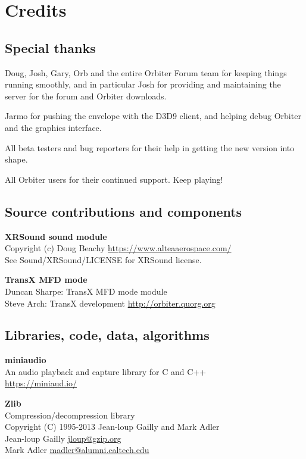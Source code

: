 \documentclass[Orbiter User Manual.tex]{subfiles}
\begin{document}
\section{Credits}

\subsection{Special thanks}
Doug, Josh, Gary, Orb and the entire Orbiter Forum team for keeping things
running smoothly, and in particular Josh for providing and maintaining the
server for the forum and Orbiter downloads.

Jarmo for pushing the envelope with the D3D9 client, and helping debug Orbiter
and the graphics interface.

All beta testers and bug reporters for their help in getting the new version
into shape.

All Orbiter users for their continued support. Keep playing!

\subsection{Source contributions and components}
\textbf{XRSound sound module}\\
Copyright (c) Doug Beachy \url{https://www.alteaaerospace.com/}\\
See Sound/XRSound/LICENSE for XRSound license.

\textbf{TransX MFD mode}\\
Duncan Sharpe: TransX MFD mode module\\
Steve Arch: TransX development \url{http://orbiter.quorg.org}

\subsection{Libraries, code, data, algorithms}
\textbf{miniaudio}\\
An audio playback and capture library for C and C++\\
\url{https://miniaud.io/}

\textbf{Zlib}\\
Compression/decompression library\\
Copyright (C) 1995-2013 Jean-loup Gailly and Mark Adler\\
Jean-loup Gailly \href{mailto:jloup@gzip.org}{jloup@gzip.org}\\
Mark Adler \href{mailto:madler@alumni.caltech.edu}{madler@alumni.caltech.edu}
\end{document}
